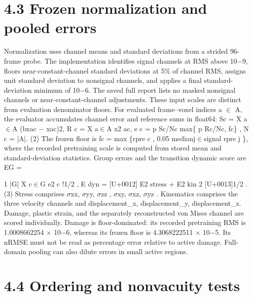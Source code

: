 \documentclass[11pt]{article}
\begin{document}
\section*{4.3 Frozen normalization and pooled errors}

Normalization uses channel means and standard deviations from a strided 96-frame probe. The
implementation identifies signal channels at RMS above 10\ensuremath{-}9, floors near-constant-channel standard
deviations at 5\% of channel RMS, assigns unit standard deviation to nonsignal channels, and applies
a final standard-deviation minimum of 10\ensuremath{-}6. The saved full report lists no masked nonsignal
channels or near-constant-channel adjustments. These input scales are distinct from evaluation
denominator floors.
For evaluated frame–voxel indices a \ensuremath{\in} A, the evaluator accumulates channel error and reference
sums in float64:
Sc =
X
a\ensuremath{\in}A
(bxac \ensuremath{-} xac)2, R c =
X
a\ensuremath{\in}A
x2
ac, e c =
p
Sc/Nc
max\{
p
Rc/Nc, fc\}
, N c = |A|. (2)
The frozen floor is fc = max \{rpre
c , 0.05 medianj\ensuremath{\in}signal rpre
j \}, where the recorded pretraining scale
is computed from stored mean and standard-deviation statistics. Group errors and the transition
dynamic score are
EG =

1
|G|
X
c\ensuremath{\in}G
e2
c
!1/2
, E dyn =
[U+0012] E2
stress + E2
kin
2
[U+0013]1/2
. (3)
Stress comprises \ensuremath{\sigma}xx, \ensuremath{\sigma}yy, \ensuremath{\sigma}zz , \ensuremath{\sigma}xy, \ensuremath{\sigma}xz, \ensuremath{\sigma}yz . Kinematics comprises the three velocity channels and
displacement\_x, displacement\_y, displacement\_z. Damage, plastic strain, and the separately
reconstructed von Mises channel are scored individually.
Damage is floor-dominated: its recorded pretraining RMS is 1.0008662254 \ensuremath{\times} 10\ensuremath{-}6, whereas its
frozen floor is 4.3068222511 \ensuremath{\times} 10\ensuremath{-}5. Its nRMSE must not be read as percentage error relative to
active damage. Full-domain pooling can also dilute errors in small active regions.

\section*{4.4 Ordering and nonvacuity tests}
\end{document}
